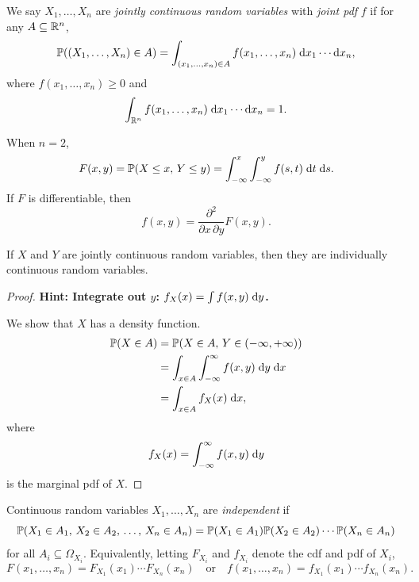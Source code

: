 \documentclass[a4paper]{article}
\begin{document}
\begin{defi}
  We say $X_1, \dotsc, X_n$ are \emph{jointly continuous random variables} with \emph{joint pdf} $f$ if for any $A \subseteq \R^n$,
  \[
    \P((X_1, \dotsc, X_n) \in A) = \int_{(x_1, \dotsc, x_n) \in A} f(x_1, \dotsc, x_n)\;\d x_1 \dotsm \d x_n,
  \]
  where $f(x_1, \dotsc, x_n) \geq 0$ and
  \[
    \int_{\R^n} f(x_1, \dotsc, x_n)\;\d x_1 \dotsm \d x_n = 1.
  \]
\end{defi}

\begin{eg}
  When $n = 2$,
  \[
    F(x, y) = \P(X \leq x,\, Y \leq y) = \int_{-\infty}^x \int_{-\infty}^y f(s, t)\;\d t\;\d s.
  \]
  If $F$ is differentiable, then
  \[
    f(x, y) = \frac{\partial^2}{\partial x\,\partial y} F(x, y).
  \]
\end{eg}

\begin{thm}
  If $X$ and $Y$ are jointly continuous random variables, then they are individually continuous random variables.
\end{thm}

\begin{proof}
  \textbf{Hint: Integrate out $y$: $f_X(x) = \int f(x,y)\;\d y$.}

  We show that $X$ has a density function.
  \begin{align*}
    \P(X \in A) &= \P(X \in A,\, Y \in (-\infty, +\infty))\\
    &= \int_{x \in A} \int_{-\infty}^\infty f(x, y)\;\d y\;\d x\\
    &= \int_{x \in A} f_X(x)\;\d x,
  \end{align*}
  where
  \[
    f_X(x) = \int_{-\infty}^\infty f(x, y)\;\d y
  \]
  is the marginal pdf of $X$.
\end{proof}

\begin{defi}
  Continuous random variables $X_1, \dotsc, X_n$ are \emph{independent} if
  \[
    \P(X_1 \in A_1,\, X_2 \in A_2,\, \dotsc,\, X_n \in A_n) = \P(X_1 \in A_1)\P(X_2 \in A_2) \dotsm \P(X_n \in A_n)
  \]
  for all $A_i \subseteq \Omega_{X_i}$.
  Equivalently, letting $F_{X_i}$ and $f_{X_i}$ denote the cdf and pdf of $X_i$,
  \[
    F(x_1, \dotsc, x_n) = F_{X_1}(x_1) \dotsm F_{X_n}(x_n)
    \quad\text{or}\quad
    f(x_1, \dotsc, x_n) = f_{X_1}(x_1) \dotsm f_{X_n}(x_n).
  \]
\end{defi}
\end{document}
